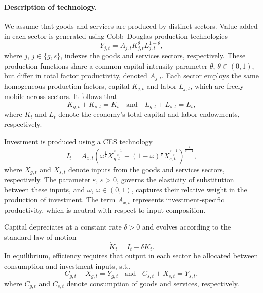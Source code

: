 \documentclass[12pt,a4paper]{article}
\begin{document}
\paragraph{Description of technology.}

We assume that goods and services are produced by distinct sectors. Value added in each sector is generated using Cobb–Douglas production technologies
\begin{equation}\label{eq:Yj}
Y_{j,t} = A_{j,t} K_{j,t}^{\theta} L_{j,t}^{1-\theta} ,
\end{equation}
where \( j \), \( j \in \{g,s\} \), indexes the goods and services sectors, respectively. These production functions share a common capital intensity parameter $\theta$, $\theta\!\in\!(0,1)$, but differ in total factor productivity, denoted \( A_{j,t} \). Each sector employs the same homogeneous production factors, capital \( K_{j,t} \) and labor \( L_{j,t} \), which are freely mobile across sectors. It follows that
\[
K_{g,t} + K_{s,t} = K_t
\quad \text{and} \quad
L_{g,t} + L_{s,t} = L_t,
\]
where \( K_t \) and \( L_t \) denote the economy's total capital and labor endowments, respectively.

Investment is produced using a CES technology
\begin{equation}\label{eq:inv_agg}
I_t = A_{x,t} \left( \omega^{\frac{1}{\varepsilon}} X_{g,t}^{\frac{\varepsilon - 1}{\varepsilon}} + (1 - \omega)^{\frac{1}{\varepsilon}} X_{s,t}^{\frac{\varepsilon - 1}{\varepsilon}} \right)^{\frac{\varepsilon}{\varepsilon - 1}},
\end{equation}
where \( X_{g,t} \) and \( X_{s,t} \) denote inputs from the goods and services sectors, respectively. The parameter  \( \varepsilon \), \( \varepsilon > 0 \), governs the elasticity of substitution between these inputs, and  \( \omega \), \( \omega \in (0,1) \), captures their relative weight in the production of investment. The term \( A_{x,t} \) represents investment-specific productivity, which is neutral with respect to input composition.

Capital depreciates at a constant rate \( \delta > 0 \) and evolves according to the standard law of motion
\begin{equation}\label{eq:K}
\dot{K}_t = I_t - \delta K_t.
\end{equation}
In equilibrium, efficiency requires that output in each sector be allocated between consumption and investment inputs, s.t.,
\[
C_{g,t} + X_{g,t} = Y_{g,t}
\ \ \ \  \text{and} \ \ \ \ 
C_{s,t} + X_{s,t} = Y_{s,t},
\]
where \( C_{g,t} \) and \( C_{s,t} \) denote consumption of goods and services, respectively.
\end{document}
